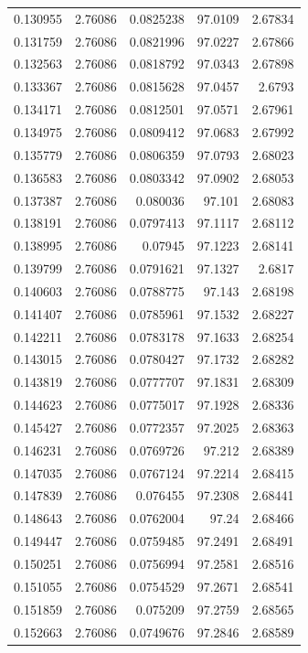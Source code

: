 \begin{tabular}{rrrrr}
 0.130955 & 2.76086 & 0.0825238 &  97.0109 & 2.67834 \\
 0.131759 & 2.76086 & 0.0821996 &  97.0227 & 2.67866 \\
 0.132563 & 2.76086 & 0.0818792 &  97.0343 & 2.67898 \\
 0.133367 & 2.76086 & 0.0815628 &  97.0457 &  2.6793 \\
 0.134171 & 2.76086 & 0.0812501 &  97.0571 & 2.67961 \\
 0.134975 & 2.76086 & 0.0809412 &  97.0683 & 2.67992 \\
 0.135779 & 2.76086 & 0.0806359 &  97.0793 & 2.68023 \\
 0.136583 & 2.76086 & 0.0803342 &  97.0902 & 2.68053 \\
 0.137387 & 2.76086 &  0.080036 &   97.101 & 2.68083 \\
 0.138191 & 2.76086 & 0.0797413 &  97.1117 & 2.68112 \\
 0.138995 & 2.76086 &   0.07945 &  97.1223 & 2.68141 \\
 0.139799 & 2.76086 & 0.0791621 &  97.1327 &  2.6817 \\
 0.140603 & 2.76086 & 0.0788775 &   97.143 & 2.68198 \\
 0.141407 & 2.76086 & 0.0785961 &  97.1532 & 2.68227 \\
 0.142211 & 2.76086 & 0.0783178 &  97.1633 & 2.68254 \\
 0.143015 & 2.76086 & 0.0780427 &  97.1732 & 2.68282 \\
 0.143819 & 2.76086 & 0.0777707 &  97.1831 & 2.68309 \\
 0.144623 & 2.76086 & 0.0775017 &  97.1928 & 2.68336 \\
 0.145427 & 2.76086 & 0.0772357 &  97.2025 & 2.68363 \\
 0.146231 & 2.76086 & 0.0769726 &   97.212 & 2.68389 \\
 0.147035 & 2.76086 & 0.0767124 &  97.2214 & 2.68415 \\
 0.147839 & 2.76086 &  0.076455 &  97.2308 & 2.68441 \\
 0.148643 & 2.76086 & 0.0762004 &    97.24 & 2.68466 \\
 0.149447 & 2.76086 & 0.0759485 &  97.2491 & 2.68491 \\
 0.150251 & 2.76086 & 0.0756994 &  97.2581 & 2.68516 \\
 0.151055 & 2.76086 & 0.0754529 &  97.2671 & 2.68541 \\
 0.151859 & 2.76086 &  0.075209 &  97.2759 & 2.68565 \\
 0.152663 & 2.76086 & 0.0749676 &  97.2846 & 2.68589 \\

\end{tabular}
